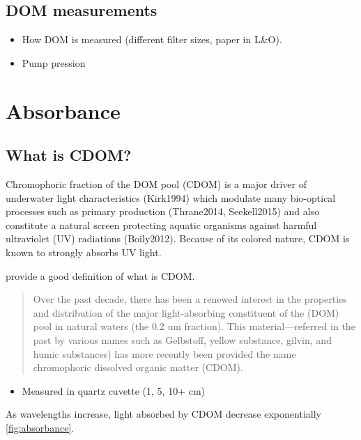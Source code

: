 \documentclass[]{book}
\providecommand{\tightlist}{%
  \setlength{\itemsep}{0pt}\setlength{\parskip}{0pt}}
\begin{document}
\section{DOM measurements}\label{dom-measurements}

\begin{itemize}
\tightlist
\item
  How DOM is measured (different filter sizes, paper in L\&O).
\item
  Pump pression
\end{itemize}

\chapter{Absorbance}\label{absorbance}

\section{What is CDOM?}\label{what-is-cdom}

Chromophoric fraction of the DOM pool (CDOM) is a major driver of
underwater light characteristics (Kirk1994) which modulate many
bio-optical processes such as primary production (Thrane2014,
Seekell2015) and also constitute a natural screen protecting aquatic
organisms against harmful ultraviolet (UV) radiations (Boily2012).
Because of its colored nature, CDOM is known to strongly absorbs UV
light.

\citet{Blough2002} provide a good definition of what is CDOM.

\begin{quote}
Over the past decade, there has been a renewed interest in the
properties and distribution of the major light-absorbing constituent of
the (DOM) pool in natural waters (the 0.2 um fraction). This
material---referred in the past by various names such as Gelbstoff,
yellow substance, gilvin, and humic substances) has more recently been
provided the name chromophoric dissolved organic matter (CDOM).
\end{quote}

\begin{itemize}
\tightlist
\item
  Measured in quartz cuvette (1, 5, 10+ cm)
\end{itemize}

As wavelengths increase, light absorbed by CDOM decrease exponentially
\ref{fig:absorbance}.
\end{document}
